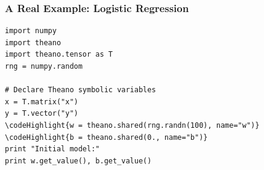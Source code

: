\documentclass[a4paper,9pt]{beamer}
\begin{document}


\begin{frame}[fragile]
  \frametitle{A Real Example: Logistic Regression}

\begin{Verbatim}[commandchars=\\\{\}]
import numpy
import theano
import theano.tensor as T
rng = numpy.random

# Declare Theano symbolic variables
x = T.matrix("x")
y = T.vector("y")
\codeHighlight{w = theano.shared(rng.randn(100), name="w")}
\codeHighlight{b = theano.shared(0., name="b")}
print "Initial model:"
print w.get_value(), b.get_value()

\end{Verbatim}
\end{frame}
\end{document}
